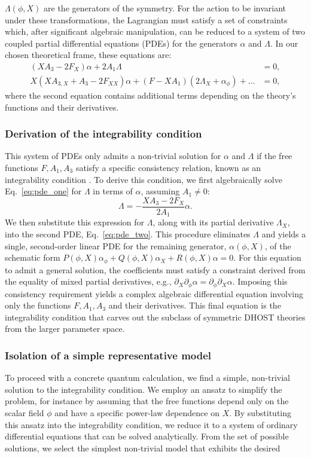\documentclass[twocolumn]{aastex631}
\begin{document}
$\Lambda(\phi, X)$ are the generators of the symmetry. For the action to be invariant under these transformations, the Lagrangian must satisfy a set of constraints which, after significant algebraic manipulation, can be reduced to a system of two coupled partial differential equations (PDEs) for the generators $\alpha$ and $\Lambda$. In our chosen theoretical frame, these equations are:\begin{align}\left(X A_3 - 2 F_X\right) \alpha + 2 A_1 \Lambda &= 0, \label{eq:pde_one} \\X \left(X A_{3,X} + A_3 - 2 F_{XX}\right) \alpha + \left(F - X A_1 \right) \left(2 \Lambda_X + \alpha_\phi \right) + \dots &= 0, \label{eq:pde_two}\end{align}where the second equation contains additional terms depending on the theory's functions and their derivatives.\subsubsection{Derivation of the integrability condition}This system of PDEs only admits a non-trivial solution for $\alpha$ and $\Lambda$ if the free functions $F, A_1, A_3$ satisfy a specific consistency relation, known as an integrability condition \citep{papachristou2019aspectsintegrabilitydifferentialsystems}. To derive this condition, we first algebraically solve Eq.~\eqref{eq:pde_one} for $\Lambda$ in terms of $\alpha$, assuming $A_1 \neq 0$:\begin{equation}\Lambda = - \frac{X A_3 - 2 F_X}{2 A_1} \alpha.\end{equation}We then substitute this expression for $\Lambda$, along with its partial derivative $\Lambda_X$, into the second PDE, Eq.~\eqref{eq:pde_two}. This procedure eliminates $\Lambda$ and yields a single, second-order linear PDE for the remaining generator, $\alpha(\phi, X)$, of the schematic form $P(\phi,X) \alpha_\phi + Q(\phi,X) \alpha_X + R(\phi,X) \alpha = 0$. For this equation to admit a general solution, the coefficients must satisfy a constraint derived from the equality of mixed partial derivatives, e.g., $\partial_X \partial_\phi \alpha = \partial_\phi \partial_X \alpha$. Imposing this consistency requirement yields a complex algebraic differential equation involving only the functions $F, A_1, A_3$ and their derivatives. This final equation is the integrability condition that carves out the subclass of symmetric DHOST theories from the larger parameter space.\subsubsection{Isolation of a simple representative model}To proceed with a concrete quantum calculation, we find a simple, non-trivial solution to the integrability condition. We employ an ansatz to simplify the problem, for instance by assuming that the free functions depend only on the scalar field $\phi$ and have a specific power-law dependence on $X$. By substituting this ansatz into the integrability condition, we reduce it to a system of ordinary differential equations that can be solved analytically. From the set of possible solutions, we select the simplest non-trivial model that exhibits the desired 
\end{document}
